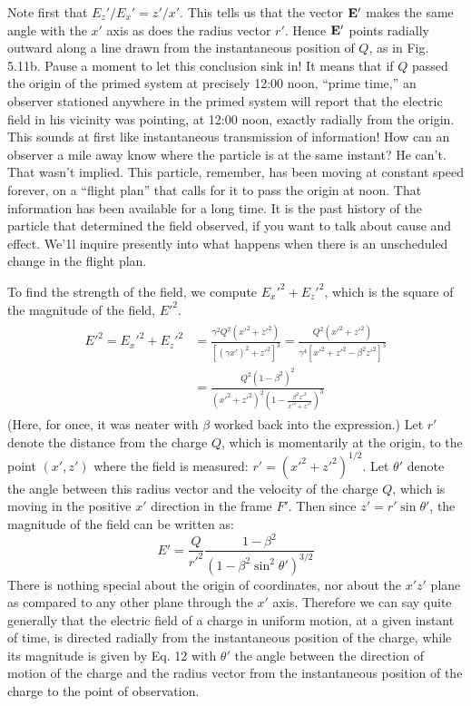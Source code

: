 Note first that $E_z'/E_x' = z' / x'$. This tells us that the vector $\mathbf{E}'$ makes
the same angle with the $x'$ axis as does the radius vector $r'$. Hence
$\mathbf{E}'$ points radially outward along a line drawn from the instantaneous
position of $Q$, as in Fig. 5.11b. Pause a moment to let this conclusion
sink in! It means that if $Q$ passed the origin of the primed system at
precisely 12:00 noon, ``prime time,'' an observer stationed anywhere
in the primed system will report that the electric field in his vicinity
was pointing, at 12:00 noon, exactly radially from the origin. This
sounds at first like instantaneous transmission of information! How
can an observer a mile away know where the particle is at the same
instant? He can't. That wasn't implied. This particle, remember,
has been moving at constant speed forever, on a ``flight plan'' that
calls for it to pass the origin at noon. That information has been
available for a long time. It is the past history of the particle that
determined the field observed, if you want to talk about cause and
effect. We'1l inquire presently into what happens when there is an
unscheduled change in the flight plan.

To find the strength of the field, we compute $E_x'^2+E_z'^2$, which is
the square of the magnitude of the field, $E'^2$.
\begin{align}
\begin{split}
  E'^2 = E_x'^2+E_z'^2 
        &= \frac{\gamma^2 Q^2 (x'^2+z'^2)}{\left[(\gamma x')^2+z'^2\right]^3}
         = \frac{Q^2 (x'^2+z'^2)}{\gamma^4\left[x'^2+z'^2-\beta^2 z'^2\right]^3} \\
        &= \frac{Q^2(1-\beta^2)^2}{(x'^2+z'^2)^2\left(1-\frac{\beta^2 z'^2}{x'^2+z'^2}\right)^3}
\end{split}
\end{align}
(Here, for once, it was neater with $\beta$ worked back into the expression.) 
Let $r'$ denote the distance from the charge $Q$, which is
momentarily at the origin, to the point $(x',z')$ where the field is
measured: $r' = (x'^2 + z'^2)^{1/2}$. Let $\theta'$ denote the angle between this
radius vector and the velocity of the charge $Q$, which is moving in
the positive $x'$ direction in the frame $F'$. Then since $z' = r' \sin \theta'$, the
magnitude of the field can be written as:
\begin{equation}
  E' = \frac{Q}{r'^2} \frac{1-\beta^2}{(1-\beta^2\sin^2\theta')^{3/2}}
\end{equation}
There is nothing special about the origin of coordinates, nor about
the $x'z'$ plane as compared to any other plane through the $x'$ axis.
Therefore we can say quite generally that the electric field of a charge
in uniform motion, at a given instant of time, is directed radially from
the instantaneous position of the charge, while its magnitude is given
by Eq. 12 with $\theta'$ the angle between the direction of motion of the
charge and the radius vector from the instantaneous position of the
charge to the point of observation.

